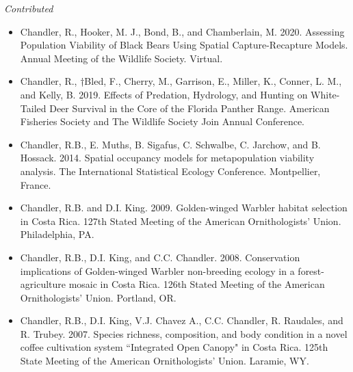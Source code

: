 
\emph{Contributed}

\begin{itemize}

\item Chandler, R., Hooker, M. J., Bond, B., and Chamberlain,
  M. 2020. Assessing Population Viability of Black Bears Using Spatial
  Capture-Recapture Models. Annual Meeting of the Wildlife
  Society. Virtual.

\item Chandler, R., †Bled, F., Cherry, M., Garrison, E., Miller, K.,
  Conner, L. M., and Kelly, B. 2019. Effects of Predation, Hydrology,
  and Hunting on White-Tailed Deer Survival in the Core of the Florida
  Panther Range. American Fisheries Society and The Wildlife Society
  Join Annual Conference. 
  

\item Chandler, R.B., E. Muths, B. Sigafus, C. Schwalbe, C. Jarchow,
  and B. Hossack. 2014. Spatial occupancy models for metapopulation
  viability analysis. The International Statistical Ecology
  Conference. Montpellier, France.

\item Chandler, R.B. and D.I. King. 2009. Golden-winged Warbler
  habitat selection in Costa Rica. 127th Stated Meeting of the
  American Ornithologists’ Union. Philadelphia, PA.

\item Chandler, R.B., D.I. King, and
  C.C. Chandler. 2008. Conservation implications of Golden-winged
  Warbler non-breeding ecology in a forest-agriculture mosaic in Costa
  Rica. 126th Stated Meeting of the American Ornithologists’
  Union. Portland, OR.

\item Chandler, R.B., D.I. King, V.J. Chavez A., C.C. Chandler,
  R. Raudales, and R. Trubey. 2007. Species richness, composition, and
  body condition in a novel coffee cultivation system ``Integrated Open
  Canopy" in Costa Rica. 125th State Meeting of the American
  Ornithologists’ Union. Laramie, WY.


\end{itemize}
